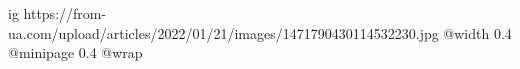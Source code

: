  
 
 
 
 

\ifcmt
  ig https://from-ua.com/upload/articles/2022/01/21/images/1471790430114532230.jpg
  @width 0.4
  @minipage 0.4
  @wrap \parpic[r]
\fi
